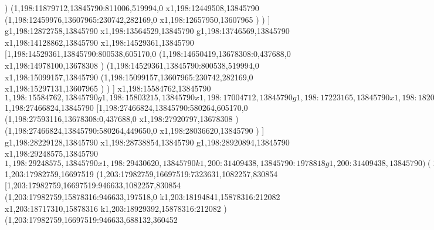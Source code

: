 {)
(1,198:11879712,13845790:811006,519994,0
x1,198:12449508,13845790
(1,198:12459976,13607965:230742,282169,0
x1,198:12657950,13607965
)
)
]
g1,198:12872758,13845790
x1,198:13564529,13845790
g1,198:13746569,13845790
x1,198:14128862,13845790
x1,198:14529361,13845790
[1,198:14529361,13845790:800538,605170,0
(1,198:14650419,13678308:0,437688,0
x1,198:14978100,13678308
)
(1,198:14529361,13845790:800538,519994,0
x1,198:15099157,13845790
(1,198:15099157,13607965:230742,282169,0
x1,198:15297131,13607965
)
)
]
x1,198:15584762,13845790
$1,198:15584762,13845790
g1,198:15803215,13845790
x1,198:17004712,13845790
g1,198:17223165,13845790
x1,198:18206207,13845790
x1,198:18533888,13845790
x1,198:19941092,13845790
g1,198:20159545,13845790
x1,198:20742089,13845790
g1,198:20960542,13845790
x1,198:22384132,13845790
g1,198:22602585,13845790
x1,198:24788945,13845790
g1,198:25007398,13845790
x1,198:25353284,13845790
x1,198:27248371,13845790
g1,198:27466824,13845790
$1,198:27466824,13845790
[1,198:27466824,13845790:580264,605170,0
(1,198:27593116,13678308:0,437688,0
x1,198:27920797,13678308
)
(1,198:27466824,13845790:580264,449650,0
x1,198:28036620,13845790
)
]
g1,198:28229128,13845790
x1,198:28738854,13845790
g1,198:28920894,13845790
x1,198:29248575,13845790
$1,198:29248575,13845790
x1,198:29430620,13845790
k1,200:31409438,13845790:1978818
g1,200:31409438,13845790
)
(1,201:11879712,14894366:19529726,455111,0
(1,200:11879712,14894366:0,291271,0
g1,200:11879712,14894366
g1,200:10765600,14894366
g1,200:10437920,14894366
(1,200:10437920,14894366:1114112,291271,0
k1,200:11552032,14894366:1114112
(1,200:11552032,14894366:0,291271,0
k1,200:11175202,14894366:-376830
x1,200:11552032,14894366
)
)
g1,200:11879712,14894366
)
x1,200:12371233,14894366
g1,200:12589686,14894366
x1,200:13030234,14894366
g1,200:13248687,14894366
x1,200:14597638,14894366
g1,200:14816091,14894366
x1,200:16017588,14894366
k1,201:31409438,14894366:15391850
g1,201:31409438,14894366
)
(1,203:11879712,16697519:13426678,1082257,830854
g1,203:17982759,16697519
(1,203:17982759,16697519:7323631,1082257,830854
g1,203:17982759,16697519
(1,203:17982759,16697519:0,550500,235932
[1,203:17982759,16697519:0,550500,235932
(1,21:17982759,16697519:0,550500,235932
r1,203:17982759,16697519:0,786432,235932
)
]
)
(1,203:17982759,16697519:7323631,1082257,830854
$1,203:17982759,16697519
(1,203:17982759,16697519:7323631,1082257,830854
[1,203:17982759,16697519:946633,1082257,830854
(1,203:17982759,15878316:946633,197518,0
k1,203:18194841,15878316:212082
x1,203:18717310,15878316
k1,203:18929392,15878316:212082
)
(1,203:17982759,16697519:946633,688132,360452
}
